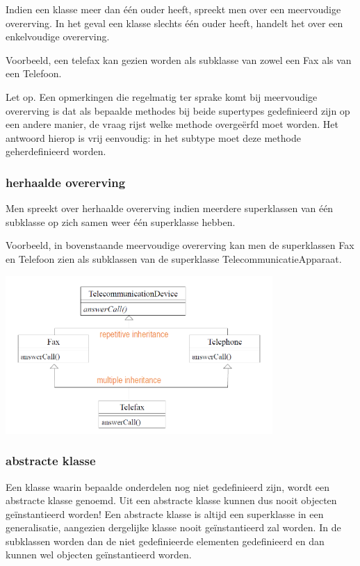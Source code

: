 Indien een klasse meer dan één ouder heeft, spreekt men over een meervoudige overerving. In het geval een klasse slechts één ouder heeft, handelt het over een enkelvoudige overerving.

Voorbeeld, een telefax kan gezien worden als subklasse van zowel een Fax als van een Telefoon.

Let op. Een opmerkingen die regelmatig ter sprake komt bij meervoudige overerving is dat als bepaalde methodes bij beide supertypes gedefinieerd zijn op een andere manier, de vraag rijst welke methode overgeërfd moet worden. Het antwoord hierop is vrij eenvoudig: in het subtype moet deze methode geherdefinieerd worden.

\subsubsection{herhaalde overerving}
Men spreekt over herhaalde overerving indien meerdere superklassen van één subklasse op zich samen weer één superklasse hebben.

Voorbeeld, in bovenstaande meervoudige overerving kan men de superklassen Fax en Telefoon zien als subklassen van de superklasse TelecommunicatieApparaat.


\begin{center}
\includegraphics[width=4in]{img/con2}%
\end{center}

\subsubsection{abstracte klasse}

Een klasse waarin bepaalde onderdelen nog niet gedefinieerd zijn, wordt een abstracte klasse genoemd. Uit een abstracte klasse kunnen dus nooit objecten geïnstantieerd worden!
Een abstracte klasse is altijd een superklasse in een generalisatie, aangezien dergelijke klasse nooit geïnstantieerd zal worden. In de subklassen worden dan de niet gedefinieerde elementen gedefinieerd en dan kunnen wel objecten geïnstantieerd worden.

